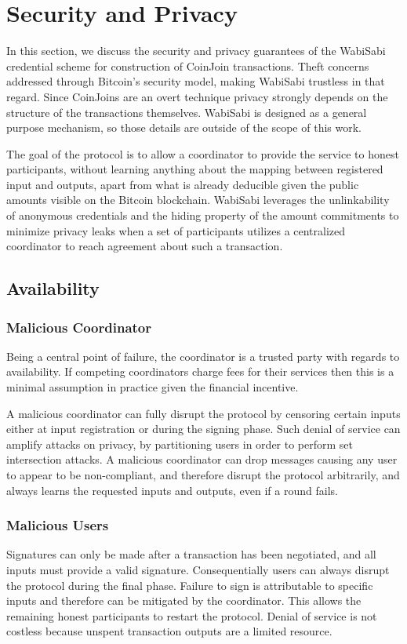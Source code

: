 \documentclass[a4paper]{article}
\begin{document}
\section{Security and Privacy} \label{sec:securitayandprivacy}

In this section, we discuss the security and privacy guarantees of the WabiSabi credential scheme for construction of CoinJoin transactions. Theft concerns addressed through Bitcoin's security model, making WabiSabi trustless in that regard. Since CoinJoins are an overt technique privacy strongly depends on the structure of the transactions themselves. WabiSabi is designed as a general purpose mechanism, so those details are outside of the scope of this work.

The goal of the protocol is to allow a coordinator to provide the service to honest participants, without learning anything about the mapping between registered input and outputs, apart from what is already deducible given the public amounts visible on the Bitcoin blockchain. WabiSabi leverages the unlinkability of anonymous credentials and the hiding property of the amount commitments to minimize privacy leaks when a set of participants utilizes a centralized coordinator to reach agreement about such a transaction.

\subsection{Availability}

\subsubsection{Malicious Coordinator}

Being a central point of failure, the coordinator is a trusted party with regards to availability. If competing coordinators charge fees for their services then this is a minimal assumption in practice given the financial incentive.

A malicious coordinator can fully disrupt the protocol by censoring certain inputs either at input registration or during the signing phase. Such denial of service can amplify attacks on privacy, by partitioning users in order to perform set intersection attacks. A malicious coordinator can drop messages causing any user to appear to be non-compliant, and therefore disrupt the protocol arbitrarily, and always learns the requested inputs and outputs, even if a round fails.

\subsubsection{Malicious Users}
Signatures can only be made after a transaction has been negotiated, and all inputs must provide a valid signature. Consequentially users can always disrupt the protocol during the final phase. Failure to sign is attributable to specific inputs and therefore can be mitigated by the coordinator. This allows the remaining honest participants to restart the protocol. Denial of service is not costless because unspent transaction outputs are a limited resource.
\end{document}
